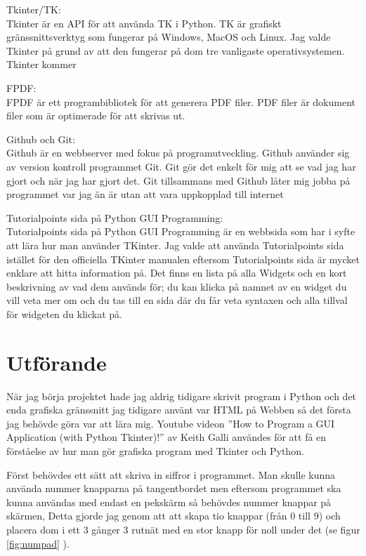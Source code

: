 \documentclass[a4paper, 12pt]{article}
\begin{document}
Tkinter/TK:\\
Tkinter är en API för att använda TK i Python. 
TK är grafiskt gränssnittsverktyg som fungerar på Windows, MacOS och Linux. 
Jag valde Tkinter på grund av att den fungerar på dom tre vanligaste operativsystemen.
Tkinter kommer 


FPDF:\\
FPDF är ett programbibliotek för att generera PDF filer.
PDF filer är dokument filer som är optimerade för att skrivas ut.


Github och Git:\\
Github är en webbserver med fokus på programutveckling. 
Github använder sig av version kontroll programmet Git. 
Git gör det enkelt för mig att se vad jag har gjort och när jag har gjort det.
Git tillsammans med Github låter mig jobba på programmet var jag än är utan att vara uppkopplad till internet


Tutorialpoints sida på Python GUI Programming:\\
Tutorialpoints sida på Python GUI Programming är en webbsida som har i syfte att lära hur man använder TKinter.
Jag valde att använda Tutorialpoints sida istället för den officiella TKinter manualen eftersom Tutorialpoints sida är mycket enklare att hitta information på. Det finns en lista på alla Widgets och en kort beskrivning av vad dem används för; du kan klicka på namnet av en widget du vill veta mer om och du tas till en sida där du får veta syntaxen och alla tillval för widgeten du klickat på.

\section{Utförande}

När jag börja projektet hade jag aldrig tidigare skrivit program i Python och det enda grafiska gränssnitt jag tidigare använt var HTML på Webben så det första jag behövde göra var att lära mig.
Youtube videon ''How to Program a GUI Application (with Python Tkinter)!'' av Keith Galli\cite{yt:galli} användes för att få en förståelse av hur man gör grafiska program med Tkinter och Python. 


Först behövdes ett sätt att skriva in siffror i programmet.
Man skulle kunna använda nummer knapparna på tangentbordet men eftersom programmet ska kunna användas med endast en pekskärm så behövdes nummer knappar på skärmen, Detta gjorde jag genom att att skapa tio knappar (från 0 till 9)  och placera dom i ett 3 gånger 3 rutnät med en stor knapp för noll under det (se figur \ref{fig:numpad} ).
\end{document}
